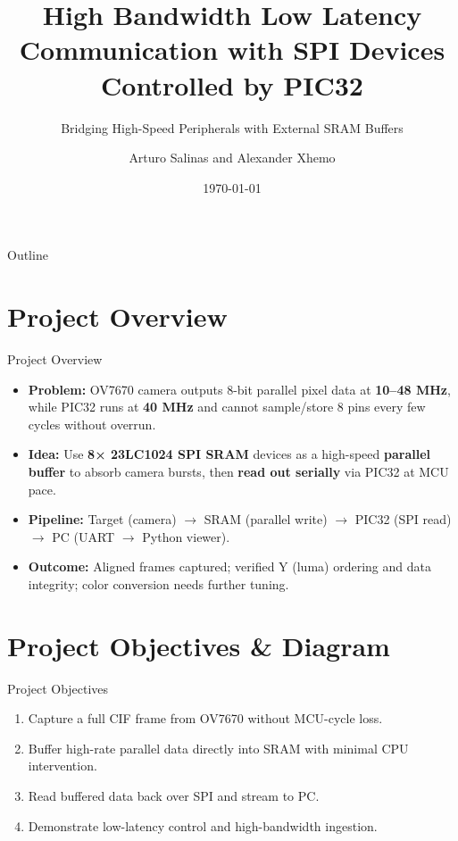 \documentclass{beamer}
\title[HBLL SPI on PIC32]{High Bandwidth Low Latency Communication with SPI Devices Controlled by PIC32}
\subtitle{Bridging High-Speed Peripherals with External SRAM Buffers}
\author{Arturo Salinas and Alexander Xhemo}
\date{\today}
\begin{document}
\begin{frame}
  \titlepage
\end{frame}

\begin{frame}{Outline}
  \tableofcontents
\end{frame}

\section{Project Overview}
\begin{frame}{Project Overview}
\begin{itemize}
  \item \textbf{Problem:} OV7670 camera outputs 8-bit parallel pixel data at \textbf{10–48 MHz}, while PIC32 runs at \textbf{40 MHz} and cannot sample/store 8 pins every few cycles without overrun.
  \item \textbf{Idea:} Use \textbf{8× 23LC1024 SPI SRAM} devices as a high-speed \textbf{parallel buffer} to absorb camera bursts, then \textbf{read out serially} via PIC32 at MCU pace.
  \item \textbf{Pipeline:} Target (camera) $\rightarrow$ SRAM (parallel write) $\rightarrow$ PIC32 (SPI read) $\rightarrow$ PC (UART $\rightarrow$ Python viewer).
  \item \textbf{Outcome:} Aligned frames captured; verified Y (luma) ordering and data integrity; color conversion needs further tuning.
\end{itemize}
\end{frame}

\section{Project Objectives \& Diagram}
\begin{frame}{Project Objectives}
\begin{enumerate}
  \item Capture a full CIF frame from OV7670 without MCU-cycle loss.
  \item Buffer high-rate parallel data directly into SRAM with minimal CPU intervention.
  \item Read buffered data back over SPI and stream to PC.
  \item Demonstrate low-latency control and high-bandwidth ingestion.
\end{enumerate}
\end{frame}
\end{document}
